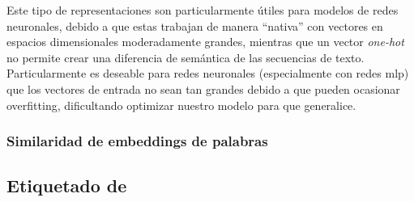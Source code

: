 Este tipo de representaciones son particularmente útiles para modelos de redes neuronales, debido a que estas trabajan de manera ``nativa'' con vectores en espacios dimensionales moderadamente grandes, mientras que un vector \emph{one-hot} no permite crear una diferencia de semántica de las secuencias de texto. Particularmente es deseable para redes neuronales (especialmente con redes \gls{mlp}) que los vectores de entrada no sean tan grandes debido a que pueden ocasionar \gls{overfitting}, dificultando optimizar nuestro modelo para que generalice.

\subsubsection{Similaridad de embeddings de palabras}


\subsection{Etiquetado de }


\subsection{}
